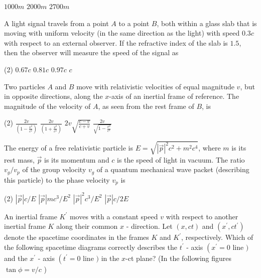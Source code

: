 \begin{enumerate}
\begin{tasks}
	\task[\textbf{B.}]$1000 m$
	\task[\textbf{C.}]$2000 m$
	\task[\textbf{D.}]$2700 m$
\end{tasks}
	\item A light signal travels from a point $A$ to a point $B$, both within a glass slab that is moving with uniform velocity (in the same direction as the light) with speed $0.3 c$ with respect to an external observer. If the refractive index of the slab is $1.5$, then the observer will measure the speed of the signal as
	{}
\begin{tasks}(2)
	\task[\textbf{A.}] $0.67 c$
	\task[\textbf{B.}]$0.81 c$
	\task[\textbf{C.}]$0.97 c$
	\task[\textbf{D.}] $c$
\end{tasks}
\begin{minipage}{\textwidth}
	\item Two particles $A$ and $B$ move with relativistic velocities of equal magnitude $v$, but in opposite directions, along the $x$-axis of an inertial frame of reference. The magnitude of the velocity of $A$, as seen from the rest frame of $B$, is
\end{minipage}
\begin{tasks}(2)
	\task[\textbf{A.}] $\frac{2 v}{\left(1-\frac{v^{2}}{c^{2}}\right)}$ 
	\task[\textbf{B.}]$\frac{2 v}{\left(1+\frac{v^{2}}{c^{2}}\right)}$
	\task[\textbf{C.}] $2 v \sqrt{\frac{c-v}{c+v}}$ 
	\task[\textbf{D.}]$\frac{2 v}{\sqrt{1-\frac{v^{2}}{c^{2}}}}$
\end{tasks}
	\item The energy of a free relativistic particle is $E=\sqrt{|\vec{p}|^{2} c^{2}+m^{2} c^{4}}$, where $m$ is its rest mass, $\vec{p}$ is its momentum and $c$ is the speed of light in vacuum. The ratio $v_{g} / v_{p}$ of the group velocity $v_{g}$ of a quantum mechanical wave packet (describing this particle) to the phase velocity $v_{p}$ is
	{}
\begin{tasks}(2)
	\task[\textbf{A.}] $|\vec{p}| c / E$
	\task[\textbf{B.}]$|\vec{p}| m c^{3} / E^{2}$
	\task[\textbf{C.}] $|\vec{p}|^{2} c^{3} / E^{2}$
	\task[\textbf{D.}]$|\vec{p}| c / 2 E$
\end{tasks}
	\item An inertial frame $K^{\prime}$ moves with a constant speed $v$ with respect to another inertial frame $K$ along their common $x$ - direction. Let $(x, c t)$ and $\left(x^{\prime}, c t^{\prime}\right)$ denote the spacetime coordinates in the frames $K$ and $K^{\prime}$, respectively. Which of the following spacetime diagrams correctly describes the $t^{\prime}$ - axis $\left(x^{\prime}=0\right.$ line $)$ and the $x^{\prime}$ - axis $\left(t^{\prime}=0\right.$ line $)$ in the $x$-ct plane? (In the following figures $\tan \phi=v / c$ )

\end{enumerate}
